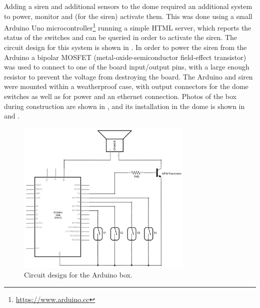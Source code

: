 \begin{colsection}
\begin{colsection}
\newpage

Adding a siren and additional sensors to the dome required an additional system to power, monitor and (for the siren) activate them. This was done using a small Arduino Uno microcontroller\footnote{\url{https://www.arduino.cc}} running a simple HTML server, which reports the status of the switches and can be queried in order to activate the siren. The circuit design for this system is shown in . In order to power the siren from the Arduino a bipolar MOSFET (metal-oxide-semiconductor field-effect transistor) was used to connect to one of the board input/output pins, with a large enough resistor to prevent the voltage from destroying the board. The Arduino and siren were mounted within a weatherproof case, with output connectors for the dome switches as well as for power and an ethernet connection. Photos of the box during construction are shown in , and its installation in the dome is shown in  and .

\begin{figure}[t]
    \begin{center}
        \includegraphics[width=0.75\textwidth]{images/arduino.png}
    \end{center}
    \caption[Circuit design for the Arduino box]{
        Circuit design for the Arduino box.
    }\label{fig:arduino_circuit}
\end{figure}

\newpage


\end{colsection}
\end{colsection}
